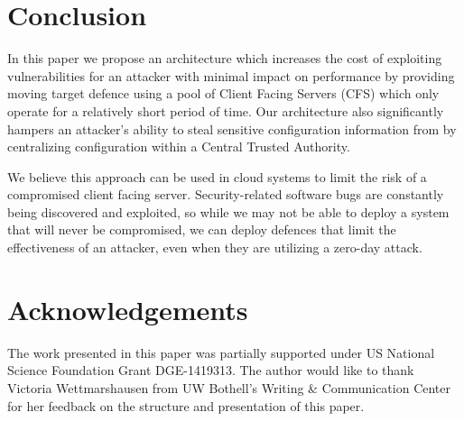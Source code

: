 \documentclass[a4paper,twoside]{article}
\begin{document}
\section{Conclusion}

In this paper we propose an architecture which increases the cost of exploiting vulnerabilities  for an attacker with minimal impact on performance by providing moving target defence using a pool of Client Facing Servers (CFS) which only operate for a relatively short period of time. Our architecture also significantly hampers an attacker's ability to steal sensitive configuration information from by centralizing configuration within a Central Trusted Authority.

We believe this approach can be used in cloud systems to limit the risk of a compromised client facing server.  Security-related software bugs are constantly being discovered and exploited, so while we may not be able to deploy a system that will never be compromised, we can deploy defences that limit the effectiveness of an attacker, even when they are utilizing a zero-day attack.

\section*{Acknowledgements}

The work presented in this paper was partially supported under US National Science Foundation Grant DGE-1419313. The author would like to thank Victoria Wettmarshausen from UW Bothell's Writing \& Communication Center for her feedback on the structure and presentation of this paper.

\balance





%
%
\end{document}
